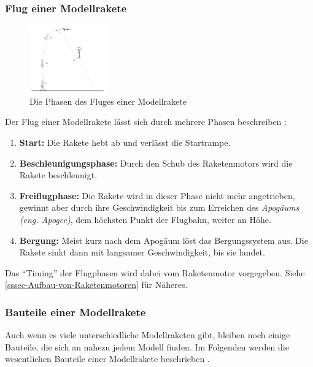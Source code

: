 \documentclass[10pt,a4paper]{article}
\begin{document}
\subsubsection{Flug einer Modellrakete}
\label{sssec-Flug-einer-Modellrakete}

\begin{figure}
	\centering
	\includegraphics[width=0.3\textwidth]{Bilder/Flug-einer-Modellrakete.png}
	\caption{Die Phasen des Fluges einer Modellrakete \cite{sn}}
	\label{fig-Flug-einer-Modellrakete}
	\vspace{-35pt}
\end{figure}

Der Flug einer Modellrakete lässt sich durch mehrere Phasen beschreiben \cite{om,sn}:
\begin{enumerate}
	\item \textbf{Start:} Die Rakete hebt ab und verlässt die Startrampe.
	\item \textbf{Beschleunigungsphase:} Durch den Schub des Raketenmotors wird die Rakete beschleunigt.
	\item \textbf{Freiflugphase:} Die Rakete wird in dieser Phase nicht mehr angetrieben, gewinnt aber durch ihre Geschwindigkeit bis zum Erreichen des \textit{Apogäums (eng. Apogee)}, dem höchsten Punkt der Flugbahn, weiter an Höhe.
	\item \textbf{Bergung:} Meist kurz nach dem Apogäum löst das Bergungssystem aus. Die Rakete sinkt dann mit langsamer Geschwindigkeit, bis sie landet.
\end{enumerate}

\noindent
Das "`Timing"' der Flugphasen wird dabei vom Raketenmotor vorgegeben. Siehe \ref{sssec-Aufbau-von-Raketenmotoren} für Näheres.


\subsubsection{Bauteile einer Modellrakete}
\label{sssec-Bauteile-einer-Modellrakete}

Auch wenn es viele unterschiedliche Modellraketen gibt, bleiben noch einige Bauteile, die sich an nahezu jedem Modell finden. Im Folgenden werden die wesentlichen Bauteile einer Modellrakete beschrieben \cite{om}.
\end{document}
